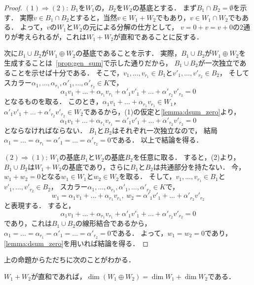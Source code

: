\begin{proof}
  $(1) \Rightarrow (2)$: $B_1$を$W_1$の，$B_2$を$W_2$の基底とする．
  まず$B_1 \cap B_2 = \emptyset$を示す．
  実際$v \in B_1 \cap B_2$とすると，当然$v \in W_1 + W_2$でもあり，$v \in W_1 \cap W_2$でもある．
  よって，$v$の$W_1$と$W_2$の元による分解の仕方として，
  $v = 0 + v = v + 0$の2通りが考えられるが，これは$W_1 + W_2$が直和であることに反する．

  次に$B_1 \cup B_2$が$W_1 \oplus W_2$の基底であることを示す．
  実際，$B_1 \cup B_2$が$W_1 \oplus W_2$を生成することは~\cref{prop:gen_sum}で示した通りだから，
  $B_1 \cup B_2$が一次独立であることを示せば十分である．
  そこで，$v_1,\dots,v_{r_1} \in B_1$と$v'_1,\dots,v'_{r_2} \in B_2$，
  そしてスカラー$\alpha_1,\dots,\alpha_{r_1}, \alpha'_1, \dots, \alpha'_{r_2} \in K$で，
  \[
    \alpha_1 v_1 + \dots + \alpha_{r_1} v_{r_1} + \alpha'_1 v'_1 + \dots + \alpha'_{r_2} v'_{r_2} = 0
  \]
  となるものを取る．
  このとき，$\alpha_1 v_1 + \dots + \alpha_{r_1} v_{r_1} \in W_1$，
  $\alpha'_1 v'_1 + \dots + \alpha'_{r_2} v'_{r_2} \in W_2$であるから，(1)の仮定と\cref{lemma:dsum_zero}より，
  \[
    \alpha_1 v_1 + \dots + \alpha_{r_1} v_{r_1} = \alpha'_1 v'_1 + \dots + \alpha'_{r_2} v'_{r_2} = 0 
  \]
  とならなければならない．
  $B_1$と$B_2$はそれぞれ一次独立なので，
  結局$\alpha_1 = \dots = \alpha_{r_1} = \alpha'_1 = \dots = \alpha'_{r_2} = 0$である．
  以上で結論を得る．

  $(2) \Rightarrow (1)$: $W_1$の基底$B_1$と$W_2$の基底$B_2$を任意に取る．
  すると，(2)より，$B_1 \cup B_2$は$W_1 + W_2$の基底であり，さらに$B_1$と$B_2$は共通部分を持たない．
  今，$w_1 + w_2 = 0$となる$w_1 \in W_1$と$w_2 \in W_2$を取る．
  そして，$v_1,\dots,v_{r_1} \in B_1$と$v'_1,\dots ,v'_{r_2} \in B_2$，
  スカラー$\alpha_1,\dots,\alpha_{r_1}, \alpha'_1, \dots, \alpha'_{r_2} \in K$で，
  \[
    w_1 = \alpha_1 v_1 + \dots + \alpha_{r_1} v_{r_1},\ 
    w_2 = \alpha'_1 v'_1 + \dots + \alpha'_{r_2} v'_{r_2}
  \]
  と表現する．
  すると，
  \[
    \alpha_1 v_1 + \dots + \alpha_{r_1} v_{r_1} + \alpha'_1 v'_1 + \dots + \alpha'_{r_2} v'_{r_2} = 0
  \]
  であり，これは$B_1 \cup B_2$の線形結合であるから，
  $\alpha_1 = \dots = \alpha_{r_1} = \alpha'_1 = \dots = \alpha'_{r_2} = 0$である．
  よって，$w_1 = w_2 = 0$であり，\cref{lemma:dsum_zero}を用いれば結論を得る．
\end{proof}
上の命題からただちに次のことがわかる．
\begin{prop}\label{prop:direct_sum_dim}
  $W_1 + W_2$が直和であれば，$\dim (W_1 \oplus W_2)=\dim W_1 + \dim W_2$である．
\end{prop}
